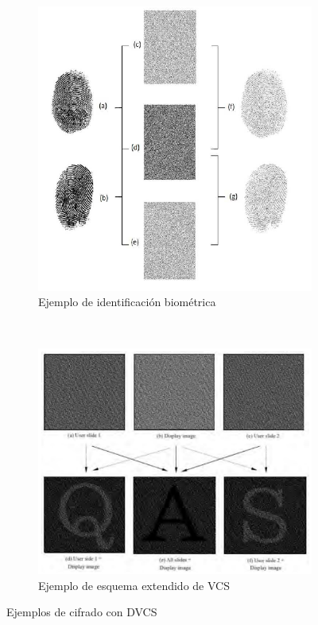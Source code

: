 \begin{figure}[hp]
	\centering
	\begin{subfigure}[t]{0.6\textwidth}
		\centering
		\includegraphics[width=\textwidth]{images/ident1}
		\caption{Ejemplo de identificación biométrica}
		\label{fig:ident1}
	\end{subfigure}
	\\[0.5cm]
	\begin{subfigure}[t]{0.6\textwidth}
		\centering
		\includegraphics[width=\textwidth]{images/ident2}
		\caption{Ejemplo de esquema extendido de VCS}
		\label{fig:ident2}
	\end{subfigure}
	\caption{Ejemplos de cifrado con DVCS}
	\label{fig:identificacion}
\end{figure}

